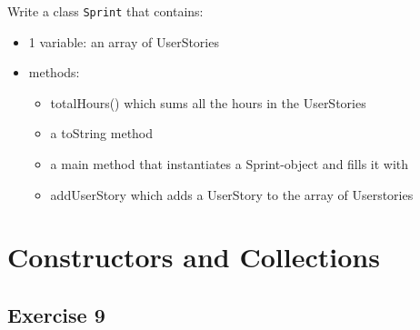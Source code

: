 Write a class \texttt{Sprint} that contains:
                 \begin{itemize}
                    \item 1 variable: an array of UserStories
                    \item methods:
                    \begin{itemize}
                        \item totalHours() which sums all the hours in the UserStories
                        \item a toString method
                        \item a main method that instantiates a Sprint-object and fills it with
                        \item addUserStory which adds a UserStory to the array of Userstories
                \end{itemize}
            \end{itemize}

\section{Constructors and Collections}
\subsection{Exercise 9}

